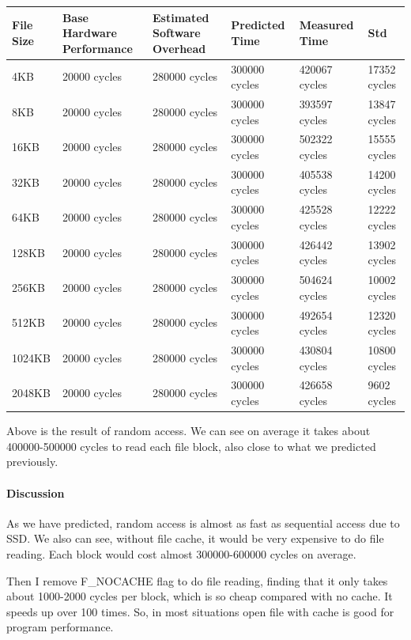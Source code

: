 \begin{center}
\begin{tabular}{| p{2cm} | p{2.5cm} | p{2.5cm} | p{2.5cm} | p{2.5cm} | p{3cm} }
File Size   & Base Hardware Performance  & Estimated Software Overhead  & Predicted Time  & Measured Time  & Std \\
\hline
4KB & 20000 cycles& 280000 cycles& 300000 cycles& 420067 cycles & 17352 cycles\\ 
8KB & 20000 cycles& 280000 cycles& 300000 cycles& 393597 cycles & 13847 cycles\\ 
16KB & 20000 cycles& 280000 cycles& 300000 cycles& 502322 cycles & 15555 cycles\\
32KB & 20000 cycles& 280000 cycles& 300000 cycles& 405538 cycles & 14200 cycles\\
64KB & 20000 cycles& 280000 cycles& 300000 cycles& 425528 cycles & 12222 cycles\\
128KB & 20000 cycles& 280000 cycles& 300000 cycles& 426442 cycles & 13902 cycles \\
256KB & 20000 cycles& 280000 cycles& 300000 cycles& 504624 cycles & 10002 cycles\\
512KB & 20000 cycles& 280000 cycles& 300000 cycles& 492654 cycles & 12320 cycles \\
1024KB & 20000 cycles& 280000 cycles& 300000 cycles& 430804 cycles & 10800 cycles\\
2048KB & 20000 cycles& 280000 cycles& 300000 cycles& 426658 cycles & 9602 cycles \\

\end{tabular}
\end{center}

Above is the result of random access. We can see on average it takes about 400000-500000 cycles to read each file block, also close to what we predicted previously.

\paragraph{Discussion}
As we have predicted, random access is almost as fast as sequential access due to SSD. We also can see, without file cache, it would be very expensive to do file reading. Each block would cost almost 300000-600000 cycles on average.

Then I remove F\_NOCACHE flag to do file reading, finding that it only takes about 1000-2000 cycles per block, which is so cheap compared with no cache. It speeds up over 100 times. So, in most situations open file with cache is good for program performance.

